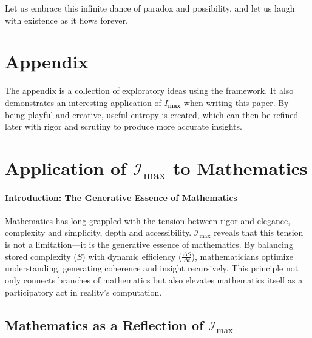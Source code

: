 \documentclass[12pt]{article}
\begin{document}
Let us embrace this infinite dance of paradox and possibility, and let us laugh with existence as it flows forever.


\appendix
\renewcommand{\thesection}{\Roman{section}}
\section{Appendix}
The appendix is a collection of exploratory ideas using the framework. It also demonstrates an interesting application of $I_\textbf{max}$ when writing this paper. By being playful and creative, useful entropy is created, which can then be refined later with rigor and scrutiny to produce more accurate insights.

\section{Application of \(\mathcal{I}_{\text{max}}\) to Mathematics}

\paragraph{Introduction: The Generative Essence of Mathematics}
Mathematics has long grappled with the tension between rigor and elegance, complexity and simplicity, depth and accessibility. \(\mathcal{I}_{\text{max}}\) reveals that this tension is not a limitation—it is the generative essence of mathematics. By balancing stored complexity (\(S\)) with dynamic efficiency (\(\frac{\Delta S}{\Delta t}\)), mathematicians optimize understanding, generating coherence and insight recursively. This principle not only connects branches of mathematics but also elevates mathematics itself as a participatory act in reality’s computation.

\subsection{Mathematics as a Reflection of \(\mathcal{I}_{\text{max}}\)}
\end{document}
